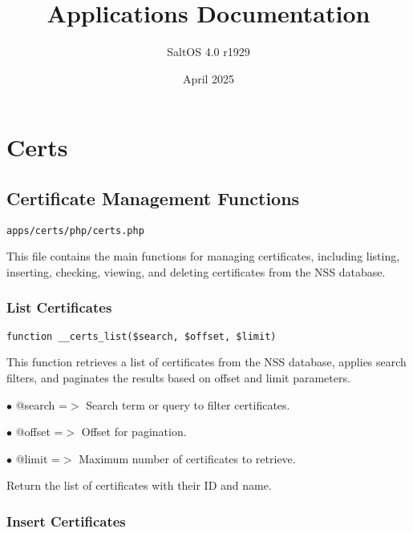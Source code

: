\documentclass[a4paper]{article}
\title{Applications Documentation}
\author{SaltOS 4.0 r1929}
\begin{document}
\date{April 2025}
\maketitle
\clearpage

\tableofcontents
\clearpage


\hypertarget{toc1}{}
\section{Certs}

\hypertarget{toc2}{}
\subsection{Certificate Management Functions}

\begin{lstlisting}
apps/certs/php/certs.php
\end{lstlisting}

This file contains the main functions for managing certificates, including listing,
inserting, checking, viewing, and deleting certificates from the NSS database.

\hypertarget{toc3}{}
\subsubsection{List Certificates}

\begin{lstlisting}
function __certs_list($search, $offset, $limit)
\end{lstlisting}

This function retrieves a list of certificates from the NSS database, applies search filters,
and paginates the results based on offset and limit parameters.

\begin{compactitem}
\item[\color{myblue}$\bullet$] @search =$>$ Search term or query to filter certificates.
\item[\color{myblue}$\bullet$] @offset =$>$ Offset for pagination.
\item[\color{myblue}$\bullet$] @limit  =$>$ Maximum number of certificates to retrieve.
\end{compactitem}

Return the list of certificates with their ID and name.

\hypertarget{toc4}{}
\subsubsection{Insert Certificates}
\end{document}
